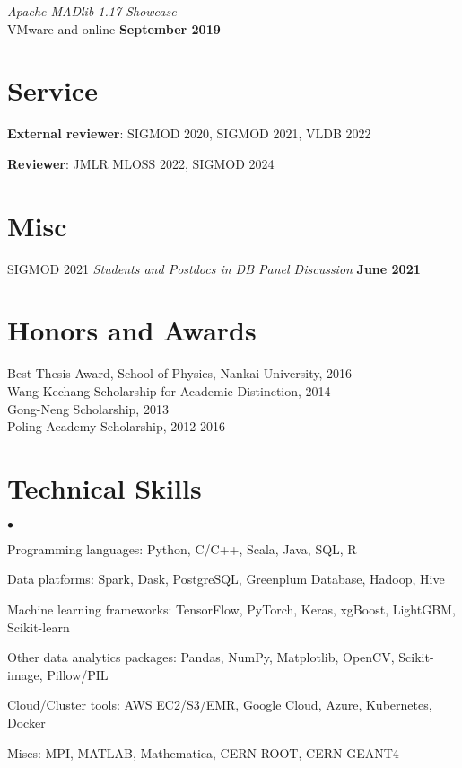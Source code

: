 \documentclass[margin,line]{res}
\newenvironment{list2}{
 \begin{list}{$\bullet$}{%
   \setlength{\itemsep}{0in}
   \setlength{\parsep}{0in} \setlength{\parskip}{0in}
   \setlength{\topsep}{0in} \setlength{\partopsep}{0in} 
   \setlength{\leftmargin}{0.2in}}}{\end{list}}
\begin{document}
\begin{resume}
\vspace{-3mm}
\textit{Apache MADlib 1.17 Showcase}\\
VMware and online \hfill {\bf September 2019}\\


\section{\sc Service}

\textbf{External reviewer}: SIGMOD 2020, SIGMOD 2021, VLDB 2022

\textbf{Reviewer}: JMLR MLOSS 2022, SIGMOD 2024


\section{\sc Misc}

SIGMOD 2021 \textit{Students and Postdocs in DB Panel Discussion} \hfill {\bf June 2021}


\section{\sc Honors and Awards} 
Best Thesis Award, School of Physics, Nankai University, 2016\\
Wang Kechang Scholarship for Academic Distinction, 2014\\
Gong-Neng Scholarship, 2013\\
Poling Academy Scholarship, 2012-2016


\section{\sc Technical Skills} 
\begin{list2}
\item Programming languages: Python, C/C++, Scala, Java, SQL, R
\item Data platforms: Spark, Dask, PostgreSQL, Greenplum Database, Hadoop, Hive
\item Machine learning frameworks: TensorFlow, PyTorch, Keras, xgBoost, LightGBM, Scikit-learn
\item Other data analytics packages: Pandas, NumPy, Matplotlib, OpenCV, Scikit-image, Pillow/PIL
\item Cloud/Cluster tools: AWS EC2/S3/EMR, Google Cloud, Azure, Kubernetes, Docker
\item Miscs: MPI, MATLAB, Mathematica, CERN ROOT, CERN GEANT4\\ 
\end{list2}



\end{resume}
\end{document}
